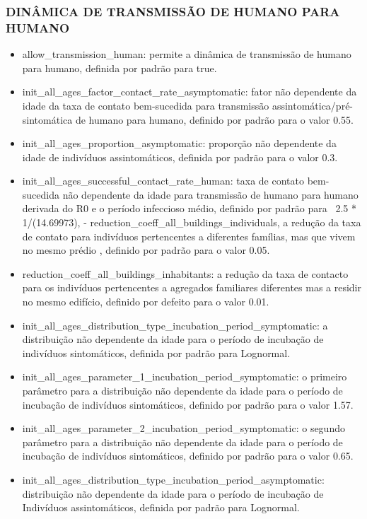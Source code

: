 \subsubsection{DINÂMICA DE TRANSMISSÃO DE HUMANO PARA HUMANO}

\begin{itemize}
\item {allow\_transmission\_human}: permite a dinâmica de transmissão de humano para humano, definida por padrão para true.
\item {init\_all\_ages\_factor\_contact\_rate\_asymptomatic}: fator não dependente da idade da taxa de contato bem-sucedida para transmissão assintomática/pré-sintomática de humano para humano, definido por padrão para o valor 0.55.
\item {init\_all\_ages\_proportion\_asymptomatic}: proporção não dependente da idade de indivíduos assintomáticos, definida por padrão para o valor 0.3.
\item {init\_all\_ages\_successful\_contact\_rate\_human}: taxa de contato bem-sucedida não dependente da idade para transmissão de humano para humano derivada do R0 e o período infeccioso médio, definido por padrão para \ 2.5 * 1/(14.69973), - {reduction\_coeff\_all\_buildings\_individuals}, a redução da taxa de contato para indivíduos pertencentes a diferentes famílias, mas que vivem no mesmo prédio , definido por padrão para o valor 0.05.
\item {reduction\_coeff\_all\_buildings\_inhabitants}: a redução da taxa de contacto para os indivíduos pertencentes a agregados familiares diferentes mas a residir no mesmo edifício, definido por defeito para o valor 0.01.
\item {init\_all\_ages\_distribution\_type\_incubation\_period\_symptomatic}: a distribuição não dependente da idade para o período de incubação de indivíduos sintomáticos, definida por padrão para Lognormal.
\item {init\_all\_ages\_parameter\_1\_incubation\_period\_symptomatic}: o primeiro parâmetro para a distribuição não dependente da idade para o período de incubação de indivíduos sintomáticos, definido por padrão para o valor 1.57.
\item {init\_all\_ages\_parameter\_2\_incubation\_period\_symptomatic}:  o segundo parâmetro para a distribuição não dependente da idade para o período de incubação de indivíduos sintomáticos, definido por padrão para o valor 0.65.
\item {init\_all\_ages\_distribution\_type\_incubation\_period\_asymptomatic}:  distribuição não dependente da idade para o período de incubação de Indivíduos assintomáticos, definida por padrão para Lognormal.

\end{itemize}
